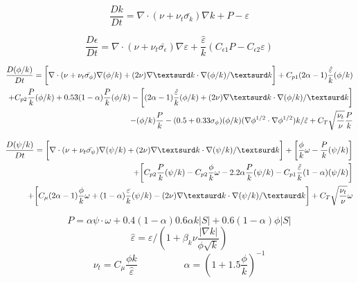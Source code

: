 \small

\begin{equation}
\dfrac{Dk}{Dt} = \nabla \cdot (\nu + \nu_{t} \bar{\sigma_{k}})\nabla k + P - \varepsilon
\end{equation}

\begin{equation}
\dfrac{D\epsilon}{Dt} = \nabla \cdot (\nu + \nu_{t} \bar{\sigma_{\epsilon}})\nabla \varepsilon + \dfrac{\hat{\varepsilon}}{k}(C_{\epsilon 1} P - C_{\epsilon 2} \varepsilon) 
\end{equation}

\begin{equation}
\begin{aligned}
\dfrac{D(\phi/k)}{Dt} = 
\bigg[ \nabla \cdot (\nu + \nu_{t} \bar{\sigma_{\phi}})\nabla (\phi/k) 
+ (2\nu) \nabla \textsurd k \cdot \nabla(\phi / k)/\textsurd k \bigg]
+ C_{p1} (2\alpha - 1) \dfrac{\hat{\varepsilon}}{k}(\phi/k) \\
+   C_{p2} \dfrac{P}{k}(\phi/k)  +   0.53 (1-\alpha) \dfrac{P}{k}(\phi/k) 
- \bigg[  (2\alpha - 1) \dfrac{\hat{\varepsilon}}{k}(\phi/k)  + (2\nu) \nabla \textsurd k \cdot \nabla(\phi / k)/\textsurd k \bigg]   \\
- (\phi/k) \dfrac{P}{k}
- (0.5 + 0.33\sigma_{\phi}) (\phi/k) (\nabla \phi^{1/2} \cdot \nabla \phi^{1/2}) k / \hat{\varepsilon}
+ C_{T}\sqrt{\dfrac{\nu_{t}}{\nu}} \dfrac{P}{k}
\end{aligned}
\end{equation}

\begin{equation}
\begin{aligned}
\dfrac{D(\psi/k)}{Dt} = \bigg[ \nabla \cdot (\nu + \nu_{t} \bar{\sigma_{\psi}})\nabla (\psi/k) 
+ (2\nu) \nabla \textsurd k \cdot \nabla(\psi / k)/\textsurd k \bigg] 
+ \bigg[ \dfrac{\phi}{k}\omega - \dfrac{P}{k}(\psi/k) \bigg] \\
+ \bigg[ C_{p2}\dfrac{P}{k}(\psi/k)  
- C_{p2}\dfrac{\phi}{k}\omega 
- 2.2 \alpha \dfrac{P}{k}(\psi/k) 
- C_{p1} \dfrac{\hat{\varepsilon}}{k} (1-\alpha) (\psi/k) \bigg] \\
+ \bigg[ C_{\mu}(2\alpha - 1)\dfrac{\phi}{k}\omega + (1-\alpha)\dfrac{\varepsilon}{k}(\psi/k) 
- (2\nu) \nabla \textsurd k \cdot \nabla(\psi / k)/\textsurd k \bigg]
+ C_{T}\sqrt{\dfrac{\nu_{t}}{\nu}}\omega \\
\end{aligned}
\end{equation}

\begin{equation*}
P =  \alpha \psi \cdot \omega + 0.4 (1-\alpha) 0.6 \alpha k |S|  + 0.6 (1-\alpha) \phi |S|
\end{equation*}
\begin{equation*}
\hat{\varepsilon} = \varepsilon / (1 + \beta_{k} \nu \dfrac{ \lvert \nabla k \rvert }{ \phi \sqrt{k} } )
\end{equation*}
\begin{equation*}
\nu_{t} = C_{\mu} \dfrac{\phi k}{\hat{\varepsilon}}  \hspace{2cm} \alpha = (1 + 1.5 \dfrac{\phi}{k})^{-1}
\end{equation*}


